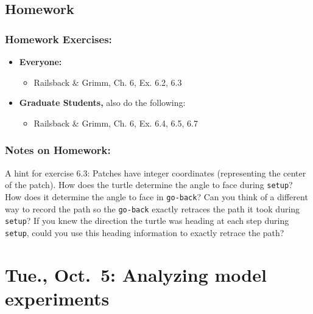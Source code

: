 \documentclass[
]{article}
\providecommand{\tightlist}{%
  \setlength{\itemsep}{0pt}\setlength{\parskip}{0pt}}
\begin{document}
\hypertarget{homework-7}{%
\subsection{Homework}\label{homework-7}}

\hypertarget{homework-exercises-7}{%
\subsubsection{Homework Exercises:}\label{homework-exercises-7}}

\begin{itemize}
\tightlist
\item
  \textbf{Everyone:}

  \begin{itemize}
  \tightlist
  \item
    Railsback \& Grimm, Ch. 6, Ex. 6.2, 6.3
  \end{itemize}
\item
  \textbf{Graduate Students,} also do the following:

  \begin{itemize}
  \tightlist
  \item
    Railsback \& Grimm, Ch. 6, Ex. 6.4, 6.5, 6.7
  \end{itemize}
\end{itemize}

\hypertarget{notes-on-homework-5}{%
\subsubsection{Notes on Homework:}\label{notes-on-homework-5}}

A hint for exercise 6.3: Patches have integer coordinates (representing
the center of the patch). How does the turtle determine the angle to
face during \texttt{setup}? How does it determine the angle to face in
\texttt{go-back}? Can you think of a different way to record the path so
the \texttt{go-back} exactly retraces the path it took during
\texttt{setup}? If you knew the direction the turtle was heading at each
step during \texttt{setup}, could you use this heading information to
exactly retrace the path?

\hypertarget{tue.-oct.-5-analyzing-model-experiments}{%
\section{Tue., Oct.~5: Analyzing model
experiments}\label{tue.-oct.-5-analyzing-model-experiments}}
\end{document}
